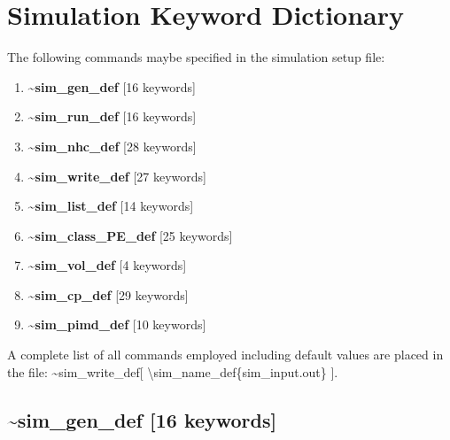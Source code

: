 \documentclass[12pt,titlepage]{article}
\begin{document}
\section{\bf Simulation Keyword Dictionary} 

The following commands maybe specified in the simulation setup file:
\begin{enumerate}
\item {\bf \~{}sim\_gen\_def} [16 keywords]
\item {\bf \~{}sim\_run\_def} [16 keywords]
\item {\bf \~{}sim\_nhc\_def} [28 keywords]
\item {\bf \~{}sim\_write\_def} [27 keywords]
\item {\bf \~{}sim\_list\_def} [14 keywords]
\item {\bf \~{}sim\_class\_PE\_def} [25 keywords]
\item {\bf \~{}sim\_vol\_def} [4 keywords]
\item {\bf \~{}sim\_cp\_def} [29 keywords]
\item {\bf \~{}sim\_pimd\_def} [10 keywords]
\end{enumerate}
A complete list of all commands employed including default
values are placed in the file:
\~{}sim\_write\_def[ \textbackslash sim\_name\_def\{sim\_input.out\} ]. 


\newpage
\subsection*{\bf \~{}sim\_gen\_def [16 keywords]}
\end{document}
